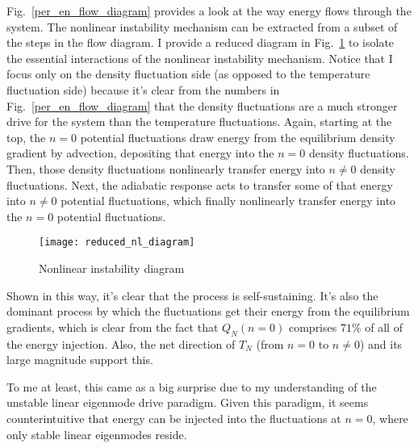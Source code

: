 Fig.~\ref{per_en_flow_diagram} provides a look at the way energy flows through the system. The nonlinear instability mechanism can be extracted from a subset of the steps in the flow diagram.
I provide a reduced diagram in Fig.~\ref{reduced_nl_diagram} to isolate the essential interactions of the nonlinear instability mechanism. Notice that I focus only on the density fluctuation
side (as opposed to the temperature fluctuation side) because it's clear from the numbers in Fig.~\ref{per_en_flow_diagram} that the density fluctuations are a much stronger drive for
the system than the temperature fluctuations. Again, starting at the top, the $n=0$ potential fluctuations draw energy from the equilibrium density gradient by advection, depositing that
energy into the $n=0$ density fluctuations. Then, those density fluctuations nonlinearly transfer energy into $n \ne 0$ density fluctuations. Next, the adiabatic response acts to transfer
some of that energy into $n \ne 0$ potential fluctuations, which finally nonlinearly transfer energy into the $n=0$ potential fluctuations.

\begin{figure}[!ht]
\centerline{\texttt{[image: reduced\_nl\_diagram]}}
\caption{Nonlinear instability diagram}
\label{reduced_nl_diagram}
\end{figure}

Shown in this way, it's clear that the process is self-sustaining. It's also the dominant process by which the fluctuations get their energy from the equilibrium gradients, which is clear
from the fact that $Q_N(n=0)$ comprises $71 \%$ of all of the energy injection. Also, the net direction of $T_N$ (from $n=0$ to $n \ne 0$) and its large magnitude support this.
 
To me at least, this came as a big surprise due to my understanding of the unstable linear eigenmode drive paradigm.
Given this paradigm, it seems counterintuitive that energy can be injected into the fluctuations at $n=0$, where only
stable linear eigenmodes reside. 

